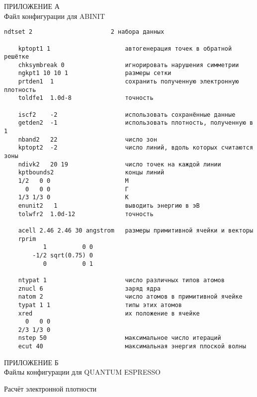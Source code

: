 \begin{center}
    ПРИЛОЖЕНИЕ А\\
    Файл конфигурации для ABINIT
\end{center}
\begin{Verbatim}[fontsize=\footnotesize]
    ndtset 2                      2 набора данных

    kptopt1 1                     автогенерация точек в обратной решётке
    chksymbreak 0                 игнорировать нарушения симметрии
    ngkpt1 10 10 1                размеры сетки
    prtden1  1                    сохранить полученную электронную плотность
    toldfe1  1.0d-8               точность

    iscf2    -2                   использовать сохранённые данные
    getden2  -1                   использовать плотность, полученную в 1
    nband2   22                   число зон
    kptopt2  -2                   число линий, вдоль которых считаются зоны
    ndivk2   20 19                число точек на каждой линии
    kptbounds2                    концы линий
    1/2   0 0                     M
      0   0 0                     Г
    1/3 1/3 0                     К
    enunit2   1                   выводить энергию в эВ
    tolwfr2  1.0d-12              точность

    acell 2.46 2.46 30 angstrom   размеры примитивной ячейки и векторы
    rprim
           1          0 0
        -1/2 sqrt(0.75) 0
           0          0 1

    ntypat 1                      число различных типов атомов
    znucl 6                       заряд ядра
    natom 2                       число атомов в примитивной ячейке
    typat 1 1                     типы этих атомов
    xred                          их положение в ячейке
      0   0 0
    2/3 1/3 0
    nstep 50                      максимальное число итераций
    ecut 40                       максимальная энергия плоской волны
\end{Verbatim}
\newpage
\begin{center}
    ПРИЛОЖЕНИЕ Б\\
    Файлы конфигурации для QUANTUM ESPRESSO
\end{center}
Расчёт электронной плотности
